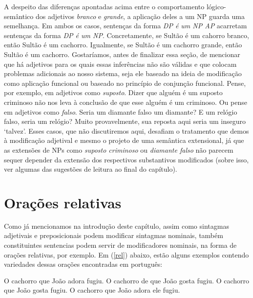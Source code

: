 A despeito das diferenças apontadas acima entre o comportamento lógico-semântico dos adjetivos \textit{branco} e \textit{grande}, a aplicação deles a um NP guarda uma semelhança. Em ambos os casos, sentenças da forma \textit{DP é um NP AP} acarretam sentenças da forma \textit{DP é um NP}. Concretamente, se Sultão é um cahorro branco, então Sultão é um cachorro. Igualmente, se Sultão é um cachorro grande, então Sultão é um cachorro. Gostaríamos, antes de finalizar essa seção, de mencionar que há adjetivos para os quais essas inferências não são válidas e que colocam problemas adicionais ao nosso sistema, seja ele baseado na ideia de modificação como aplicação funcional ou baseado no princípio de conjunção funcional. Pense, por exemplo, em adjetivos como \textit{suposto}. Dizer que alguém é um suposto criminoso não nos leva à conclusão de que esse alguém é um criminoso. Ou pense em adjetivos como \textit{falso}. Seria um diamante falso um diamante? E um relógio falso, seria um relógio? Muito provavelmente, sua reposta aqui seria um inseguro `talvez'. Esses casos, que não discutiremos aqui, desafiam o tratamento que demos à modificação adjetival e mesmo o projeto de uma semântica extensional, já que as extensões de NPs como \textit{suposto criminoso} ou \textit{diamante falso} não parecem sequer depender da extensão dos respectivos substantivos modificados (sobre isso, ver algumas das sugestões de leitura ao final do capítulo).  

\section{Orações relativas}

Como já mencionamos na introdução deste capítulo, assim como sintagmas adjetivais e preposicionais podem modificar
sintagmas nominais, também constituintes sentencias podem servir
de modificadores nominais, na forma de orações relativas, por exemplo. Em
(\ref{rel}) abaixo, estão alguns exemplos contendo variedades
dessas orações encontradas em português:


\begin{exe}
    \ex\label{rel}
    \begin{xlist}
        \ex  O cachorro que João adora fugiu.\label{rela}
        \ex  O cachorro de que João gosta fugiu.\label{relb}
        \ex  O cachorro que João gosta fugiu.\label{relc}
        \ex  O cachorro que João adora ele fugiu.\label{reld}
    \end{xlist}
\end{exe}

